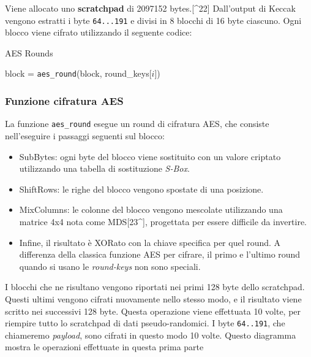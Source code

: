 Viene allocato uno \textbf{scratchpad} di 2097152 bytes.{[}\^{}22{]}
Dall'output di Keccak vengono estratti i byte \texttt{64...191} e divisi
in 8 blocchi di 16 byte ciascuno. Ogni blocco viene cifrato utilizzando
il seguente codice:

\begin{algorithm}
  \caption{AES Rounds}
  \begin{algorithmic}[1]
      \State block = \texttt{aes\_round}(block, round\_keys[$i$])
  \EndFor
  \end{algorithmic}
  \end{algorithm}


\subsubsection{Funzione cifratura AES}\label{funzione-cifratura-aes}

La funzione \texttt{aes\_round} esegue un round di cifratura AES, che
consiste nell'eseguire i passaggi seguenti sul blocco:

\begin{itemize}
\item
  SubBytes: ogni byte del blocco viene sostituito con un valore criptato
  utilizzando una tabella di sostituzione \emph{S-Box}.
\item
  ShiftRows: le righe del blocco vengono spostate di una posizione.
\item
  MixColumns: le colonne del blocco vengono mescolate utilizzando una
  matrice 4x4 nota come MDS{[}23\^{}{]}, progettata per essere difficile
  da invertire.
\item
  Infine, il risultato è XORato con la chiave specifica per quel round.
  A differenza della classica funzione AES per cifrare, il primo e
  l'ultimo round quando si usano le \emph{round-keys} non sono speciali.
\end{itemize}

I blocchi che ne risultano vengono riportati nei primi 128 byte dello
scratchpad. Questi ultimi vengono cifrati nuovamente nello stesso modo,
e il risultato viene scritto nei successivi 128 byte. Questa operazione
viene effettuata 10 volte, per riempire tutto lo scratchpad di dati
pseudo-randomici. I byte \texttt{64..191}, che chiameremo
\emph{payload}, sono cifrati in questo modo 10 volte. Questo diagramma
mostra le operazioni effettuate in questa prima parte

